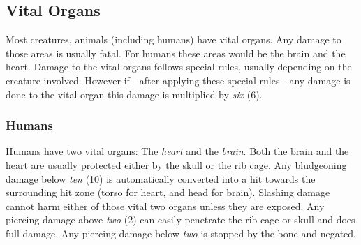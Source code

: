 \subsection{Vital Organs}
\label{sub:7-Vital Organs}

Most creatures, animals (including humans) have vital organs. Any damage
to those areas is usually fatal. For humans these areas would be the brain
and the heart. Damage to the vital organs follows special rules, usually
depending on the creature involved. However if - after applying these special
rules - any damage is done to the vital organ this damage is multiplied by
\emph{six} (6).

\subsubsection{Humans}
\label{subs:7-Humans}

Humans have two vital organs: The \emph{heart} and the \emph{brain}. Both
the brain and the heart are usually protected either by the skull or the
rib cage. Any bludgeoning damage below \emph{ten} (10) is automatically
converted into a hit towards the surrounding hit zone (torso for
heart, and head for brain). Slashing damage cannot harm either of those
vital two organs unless they are exposed. Any piercing damage above \emph{two}
(2) can easily penetrate the rib cage or skull and does full damage. Any
piercing damage below \emph{two} is stopped by the bone and negated.
